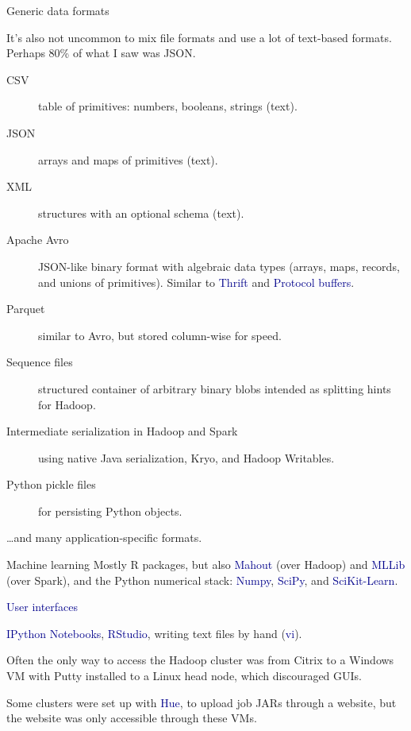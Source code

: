 \documentclass{beamer}
\begin{document}
\begin{frame}{Generic data formats}

It's also not uncommon to mix file formats and use a lot of text-based formats. Perhaps 80\% of what I saw was JSON.

\begin{description}
\item[CSV] table of primitives: numbers, booleans, strings (text).
\item[JSON] arrays and maps of primitives (text).
\item[XML] structures with an optional schema (text).
\item[Apache Avro] JSON-like binary format with algebraic data types (arrays, maps, records, and unions of primitives). Similar to \textcolor{darkblue}{Thrift} and \textcolor{darkblue}{Protocol buffers}.
\item[Parquet] similar to Avro, but stored column-wise for speed.
\item[Sequence files] structured container of arbitrary binary blobs intended as splitting hints for Hadoop.
\item[Intermediate serialization in Hadoop and Spark] using native Java serialization, Kryo, and Hadoop Writables.
\item[Python pickle files] for persisting Python objects.
\end{description}

\ldots and many application-specific formats.
\end{frame}

\begin{frame}{Machine learning}
Mostly R packages, but also \textcolor{darkblue}{Mahout} (over Hadoop) and \textcolor{darkblue}{MLLib} (over Spark), and the Python numerical stack: \textcolor{darkblue}{Numpy}, \textcolor{darkblue}{SciPy}, and \textcolor{darkblue}{SciKit-Learn}.

\vfill
\hspace{-0.83 cm} \textcolor{darkblue}{\Large User interfaces}

\vspace{0.5 cm}
\textcolor{darkblue}{IPython Notebooks}, \textcolor{darkblue}{RStudio}, writing text files by hand (\textcolor{darkblue}{vi}).

\vspace{0.5 cm}
Often the only way to access the Hadoop cluster was from Citrix to a Windows VM with Putty installed to a Linux head node, which discouraged GUIs.

\vspace{0.5 cm}
Some clusters were set up with \textcolor{darkblue}{Hue}, to upload job JARs through a website, but the website was only accessible through these VMs.
\end{frame}
\end{document}

